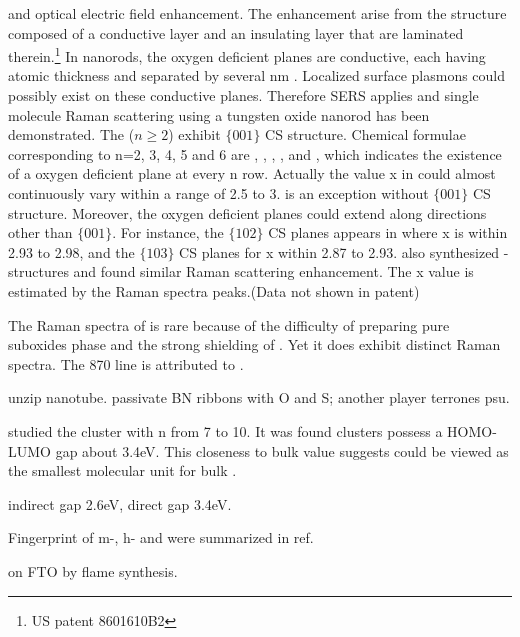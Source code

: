  and optical electric field enhancement. The enhancement arise from the structure composed of a conductive layer and an insulating layer that are laminated therein.\footnote{US patent 8601610B2} In  nanorods, the oxygen deficient planes are conductive, each having atomic thickness and separated by several nm . Localized surface plasmons could possibly exist on these conductive planes. Therefore SERS applies and single molecule Raman scattering using a tungsten oxide nanorod has been demonstrated. The  ($n \geq 2$) exhibit $\{ 001 \}$ CS structure. Chemical formulae corresponding to n=2, 3, 4, 5 and 6 are , , , , and , which indicates the existence of a oxygen deficient plane at every n row. Actually the value x in  could almost continuously vary within a range of 2.5 to 3.  is an exception without $\{ 001 \}$ CS structure. Moreover, the oxygen deficient planes could extend along directions other than $\{ 001 \}$. For instance, the $\{ 102 \}$ CS planes appears in  where x is within 2.93 to 2.98, and  the $\{ 103 \}$ CS planes for x within 2.87 to 2.93. \citeauthor{Shingaya2013} also synthesized - structures and found similar Raman scattering enhancement. The x value is estimated by the Raman spectra peaks.\cite{Shingaya2013}(Data not shown in patent)

The Raman spectra of  is rare because of the difficulty of preparing pure suboxides phase and the strong shielding of . Yet it does exhibit distinct Raman spectra. \cite{Tenne2005} The 870 line is attributed to .\cite{Hardcastle1995}

unzip nanotube. passivate BN ribbons with O and S; another player terrones psu.

\citeauthor{Huang2006} studied the  cluster with n from 7 to 10.\cite{Huang2006} It was found  clusters possess a HOMO-LUMO gap about 3.4eV. This closeness to bulk value suggests  could be viewed as the smallest molecular unit for bulk .

 indirect gap 2.6eV, direct gap 3.4eV. \cite{Koffyberg1979}

Fingerprint of m-, h- and  were summarized in ref\cite{Daniel1987}.

  on FTO by flame synthesis.\cite{Rao2014} \cite{Xu2006}

